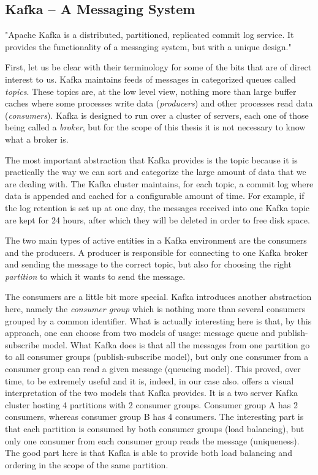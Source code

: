 \subsection{Kafka -- A Messaging System}
\label{sub-sec:kafka}

"Apache Kafka is a distributed, partitioned, replicated commit log service. It
provides the functionality of a messaging system, but with a unique
design."\cite{kafka}

First, let us be clear with their terminology for some of the bits that are of
direct interest to us. Kafka maintains feeds of messages in categorized queues
called \textit{topics}. These topics are, at the low level view, nothing more
than large buffer caches where some processes write data (\textit{producers})
and other processes read data (\textit{consumers}). Kafka is designed to run
over a cluster of servers, each one of those being called a \textit{broker}, but
for the scope of this thesis it is not necessary to know what a broker is.

The most important abstraction that Kafka provides is the topic because it is
practically the way we can sort and categorize the large amount of data that
we are dealing with. The Kafka cluster maintains, for each topic, a commit log
where data is appended and cached for a configurable amount of time. For
example, if the log retention is set up at one day, the messages received into
one Kafka topic are kept for 24 hours, after which they will be deleted in
order to free disk space.

The two main types of active entities in a Kafka environment are the consumers
and the producers. A producer is responsible for connecting to one Kafka
broker and sending the message to the correct topic, but also for choosing the
right \textit{partition} to which it wants to send the message.

The consumers are a little bit more special. Kafka introduces another abstraction
here, namely the \textit{consumer group} which is nothing more than several
consumers grouped by a common identifier. What is actually
interesting here is that, by this approach, one can choose from two models of
usage: message queue and publish-subscribe model. What Kafka does is that all
the messages from one partition go to all consumer groups (publish-subscribe
model), but only one consumer from a consumer group can read a given message
(queueing model). This proved, over time, to be extremely useful and it is,
indeed, in our case also.  offers a
visual interpretation of the two models that Kafka provides. It is a two
server Kafka cluster hosting 4 partitions with 2 consumer groups. Consumer
group A has 2 consumers, whereas consumer group B has 4 consumers. The
interesting part is that each partition is consumed by both consumer groups
(load balancing), but only one consumer from each consumer group reads the
message (uniqueness). The good part here is that Kafka is able to provide both
load balancing and ordering in the scope of the same partition.

